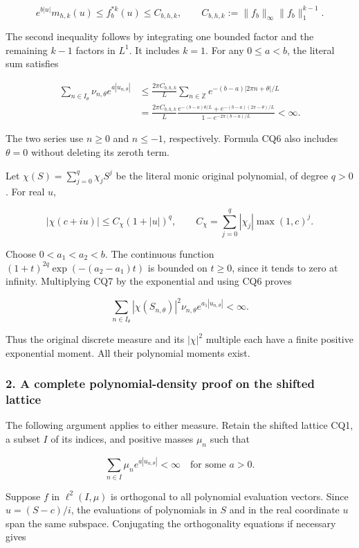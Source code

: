 \[
e^{b|u|}m_{h,k}(u)
\le f_b^{*k}(u)
\le C_{b,h,k},\qquad
C_{b,h,k}:=\|f_b\|_\infty\|f_b\|_1^{k-1}.
\tag{CQ5}
\]

The second inequality follows by integrating one bounded factor and the remaining \(k-1\) factors in \(L^1\). It includes \(k=1\). For any \(0 \le a < b\), the literal sum satisfies

\[
\begin{aligned}
\sum_{n\in I_\theta}\nu_{n,\theta}e^{a|u_{n,\theta}|}
&\le\frac{2\pi C_{b,h,k}}L
\sum_{n\in\mathbb Z}e^{-(b-a)|2\pi n+\theta|/L}\\
&=\frac{2\pi C_{b,h,k}}L
\frac{e^{-(b-a)\theta/L}+e^{-(b-a)(2\pi-\theta)/L}}
{1-e^{-2\pi(b-a)/L}}<\infty.
\end{aligned}
\tag{CQ6}
\]

The two series use \(n \ge 0\) and \(n \le -1\), respectively. Formula CQ6 also includes \(\theta=0\) without deleting its zeroth term.

Let \(\chi(S)=\sum_{j=0}^q \chi_j S^j\) be the literal monic original polynomial, of degree \(q>0\). For real \(u\),

\[
|\chi(c+iu)|\le
C_\chi(1+|u|)^q,\qquad
C_\chi=\sum_{j=0}^q|\chi_j|\max(1,c)^j.
\tag{CQ7}
\]

Choose \(0 < a_1 < a_2 < b\). The continuous function \((1+t)^{2q} \exp(-(a_2-a_1)t)\) is bounded on \(t \ge 0\), since it tends to zero at infinity. Multiplying CQ7 by the exponential and using CQ6 proves

\[
\sum_{n\in I_\theta}
|\chi(S_{n,\theta})|^2\nu_{n,\theta}
e^{a_1|u_{n,\theta}|}<\infty.
\tag{CQ8}
\]

Thus the original discrete measure and its \(|\chi|^2\) multiple each have a finite positive exponential moment. All their polynomial moments exist.

\subsubsection{2. A complete polynomial-density proof on the shifted lattice}\label{a-complete-polynomial-density-proof-on-the-shifted-lattice}

The following argument applies to either measure. Retain the shifted lattice CQ1, a subset \(I\) of its indices, and positive masses \(\mu_n\) such that

\[
\sum_{n\in I}\mu_ne^{a|u_{n,\theta}|}<\infty
\quad\text{for some }a>0.
\tag{CQ9}
\]

Suppose \(f\) in \(\ell^2(I,\mu)\) is orthogonal to all polynomial evaluation vectors. Since \(u=(S-c)/i\), the evaluations of polynomials in \(S\) and in the real coordinate \(u\) span the same subspace. Conjugating the orthogonality equations if necessary gives

